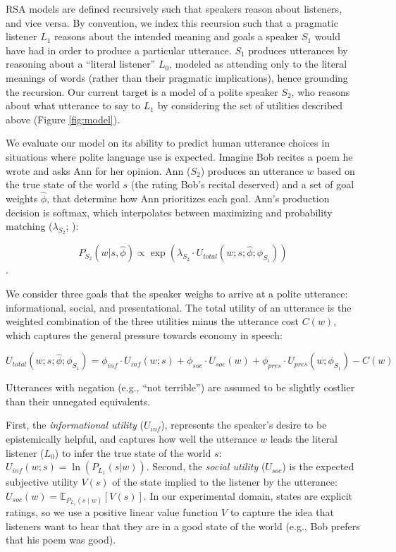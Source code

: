 \documentclass[12pt]{article}
\begin{document}

RSA models are defined recursively such that speakers reason about
listeners, and vice versa. By convention, we index this recursion such that a pragmatic listener \(L_1\) reasons about the intended meaning
and goals a speaker \(S_1\) would have had in order to produce a particular
utterance.
\(S_1\) produces utterances by reasoning about a \enquote{literal listener} \(L_0\), modeled as attending only to the literal meanings of words
(rather than their pragmatic implications), hence grounding the
recursion.
Our current target is a model of a polite speaker
\(S_2\), who reasons about what utterance to say to \(L_1\) by
considering the set of utilities described above (Figure
\ref{fig:model}).

We evaluate our model on its ability to predict human utterance choices in situations where polite language use is expected. Imagine Bob recites a poem he wrote and asks Ann for her opinion.
Ann (\(S_2\)) produces an utterance \(w\) based on the true state of the world \(s\) (the rating Bob's recital deserved) and a set of goal weights
\(\hat{\phi}\), that determine how Ann prioritizes each goal.
Ann's production decision is softmax, which interpolates between
maximizing and probability matching (\(\lambda_{S_2}\); \cite{goodman2013}):

\[P_{S_2}(w | s, \hat{\phi}) \propto \exp(\lambda_{S_2} \cdot U_{total}(w; s; \hat{\phi}; \phi_{S_{1}}))\].

We consider three goals that the speaker weighs to arrive at a polite utterance: informational, social, and presentational.
The total utility of an utterance is the weighted combination of the three
utilities minus the utterance cost \(C(w)\), which captures the general pressure towards economy in speech:

\[U_{total}(w; s; \hat{\phi}; \phi_{S_{1}}) = \phi_{inf} \cdot U_{inf}(w; s) + \phi_{soc} \cdot U_{soc}(w) + \phi_{pres} \cdot U_{pres}(w; \phi_{S_{1}}) - C(w)\]

\noindent Utterances with negation (e.g., \enquote{not terrible}) are assumed to be slightly costlier than their unnegated equivalents.

First, the \emph{informational utility}
(\(U_{inf}\)), represents the speaker's desire to be epistemically
helpful, and captures how well the utterance $w$ leads the literal listener (\(L_0\)) to infer the true state of the world $s$:
\(U_{inf}(w; s) = \ln(P_{L_1}(s | w))\).
Second, the \emph{social utility} (\(U_{soc}\)) is the expected subjective utility
\(V(s)\) of the state implied to the listener by the utterance:
\(U_{soc}(w) = \mathbb{E}_{P_{L_1}(s \mid w)}[V(s)]\).
In our experimental domain, states are explicit ratings, so we use a positive linear value function $V$ to capture the idea that listeners want to hear that they are in a good state of the world (e.g., Bob prefers that his poem was good).
\end{document}
